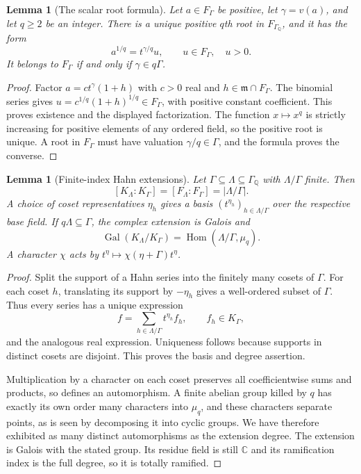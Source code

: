 \documentclass[11pt,letterpaper]{article}
\numberwithin{equation}{section}
\newtheorem{lemma}[theorem]{Lemma}
\theoremstyle{definition}
\theoremstyle{remark}
\newcommand{\C}{\mathbb C}
\newcommand{\Q}{\mathbb Q}
\newcommand{\mm}{\mathfrak m}
\newcommand{\Gal}{\operatorname{Gal}}
\newcommand{\Hom}{\operatorname{Hom}}
\newcommand{\FG}{F_{\Gamma}}
\begin{document}
\begin{lemma}[The scalar root formula]\label{lem:scalarroot}
Let $a\in\FG$ be positive, let $\gamma=v(a)$, and let $q\ge2$ be an integer.
There is a unique positive $q$th root in $F_{\Gamma_{\Q}}$, and it has the form
\begin{equation}\label{eq:scalarroot}
 a^{1/q}=t^{\gamma/q}u,\qquad u\in\FG,\quad u>0.
\end{equation}
It belongs to $\FG$ if and only if $\gamma\in q\Gamma$.
\end{lemma}
\begin{proof}
Factor $a=c t^\gamma(1+h)$ with $c>0$ real and $h\in\mm\cap\FG$.
The binomial series gives
$u=c^{1/q}(1+h)^{1/q}\in\FG$, with positive constant coefficient.
This proves existence and the displayed factorization. The function
$x\mapsto x^q$ is strictly increasing for positive elements of any ordered
field, so the positive root is unique. A root in $\FG$ must have valuation
$\gamma/q\in\Gamma$, and the formula proves the converse.
\end{proof}

\begin{lemma}[Finite-index Hahn extensions]\label{lem:finite-index}
Let $\Gamma\subseteq\Lambda\subseteq\Gamma_{\Q}$ with $\Lambda/\Gamma$
finite. Then
\begin{equation}\label{eq:finite-index}
 [K_\Lambda:K_\Gamma]=[F_\Lambda:F_\Gamma]=|\Lambda/\Gamma|.
\end{equation}
A choice of coset representatives $\eta_h$ gives a basis
$(t^{\eta_h})_{h\in\Lambda/\Gamma}$ over the respective base field.
If $q\Lambda\subseteq\Gamma$, the complex extension is Galois and
\begin{equation}\label{eq:galois}
 \Gal(K_\Lambda/K_\Gamma)=\Hom(\Lambda/\Gamma,\mu_q).
\end{equation}
A character $\chi$ acts by $t^\eta\mapsto\chi(\eta+\Gamma)t^\eta$.
\end{lemma}
\begin{proof}
Split the support of a Hahn series into the finitely many cosets of $\Gamma$.
For each coset $h$, translating its support by $-\eta_h$ gives a well-ordered
subset of $\Gamma$. Thus every series has a unique expression
\[
 f=\sum_{h\in\Lambda/\Gamma}t^{\eta_h}f_h,\qquad f_h\in K_\Gamma,
\]
and the analogous real expression. Uniqueness follows because supports in
distinct cosets are disjoint. This proves the basis and degree assertion.

Multiplication by a character on each coset preserves all coefficientwise
sums and products, so defines an automorphism. A finite abelian group killed
by $q$ has exactly its own order many characters into $\mu_q$, and these
characters separate points, as is seen by decomposing it into cyclic groups.
We have therefore exhibited as many distinct automorphisms as the extension
degree. The extension is Galois with the stated group. Its residue field is
still $\C$ and its ramification index is the full degree, so it is totally
ramified.
\end{proof}
\end{document}
